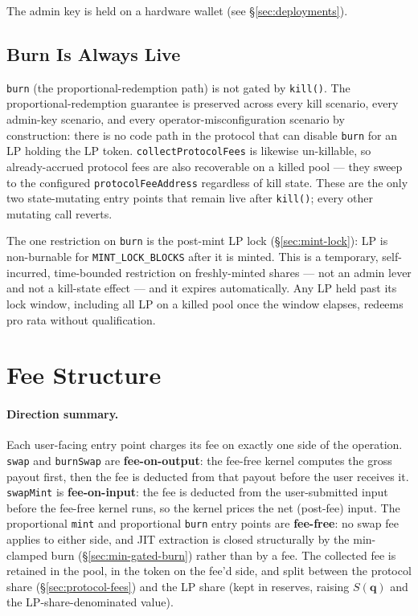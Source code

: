 \documentclass[11pt]{article}
\newcommand{\Sm}{S(\mathbf{q})}
\begin{document}
The admin key is held on a hardware wallet (see
\S\ref{sec:deployments}).

\subsection{Burn Is Always Live}

\texttt{burn} (the proportional-redemption path) is not gated by
\texttt{kill()}. The proportional-redemption guarantee is preserved
across every kill scenario, every admin-key scenario, and every
operator-misconfiguration scenario by construction: there is no code path
in the protocol that can disable \texttt{burn} for an LP holding the LP
token. \texttt{collectProtocolFees} is likewise un-killable, so
already-accrued protocol fees are also recoverable on a killed pool ---
they sweep to the configured \texttt{protocolFeeAddress} regardless of
kill state. These are the only two state-mutating entry points that
remain live after \texttt{kill()}; every other mutating call reverts.

The one restriction on \texttt{burn} is the post-mint LP lock
(\S\ref{sec:mint-lock}): LP is non-burnable for
\texttt{MINT\_LOCK\_BLOCKS} after it is minted. This is a temporary,
self-incurred, time-bounded restriction on freshly-minted shares --- not
an admin lever and not a kill-state effect --- and it expires
automatically. Any LP held past its lock window, including all LP on a
killed pool once the window elapses, redeems pro rata without
qualification.

\section{Fee Structure}
\label{sec:fees}

\paragraph{Direction summary.}
Each user-facing entry point charges its fee on exactly one side of the
operation. \texttt{swap} and \texttt{burnSwap} are
\textbf{fee-on-output}: the fee-free kernel computes the gross payout
first, then the fee is deducted from that payout before the user
receives it. \texttt{swapMint} is \textbf{fee-on-input}: the fee is
deducted from the user-submitted input before the fee-free kernel
runs, so the kernel prices the net (post-fee) input. The proportional
\texttt{mint} and proportional \texttt{burn} entry points are
\textbf{fee-free}: no swap fee applies to either side, and JIT
extraction is closed structurally by the min-clamped burn
(\S\ref{sec:min-gated-burn}) rather than by a fee. The collected fee
is retained in the pool, in the token on the fee'd side, and split
between the protocol share (\S\ref{sec:protocol-fees}) and the LP
share (kept in reserves, raising $\Sm$ and the LP-share-denominated
value).
\end{document}
